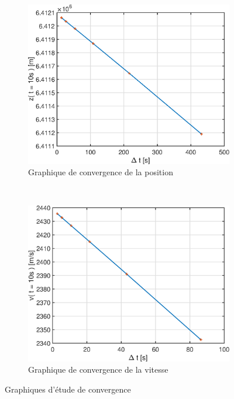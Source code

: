 \documentclass[a4paper,12pt,twoside]{article}
\begin{document}
\begin{figure}[h]
	\centering
	\begin{subfigure}[b]{0.45\textwidth}
		\includegraphics[width=\textwidth]{graphs/zConvB.eps}
		\caption{Graphique de convergence de la position}
		\label{fig:B-zConv}
	\end{subfigure}
	~
	\begin{subfigure}[b]{0.45\textwidth}
		\includegraphics[width=\textwidth]{graphs/vConvB.eps}
		\caption{Graphique de convergence de la vitesse}
		\label{fig:B-vConv}
	\end{subfigure}
	\caption{Graphiques d'étude de convergence}
	\label{fig:B-conv}
\end{figure}
\end{document}
